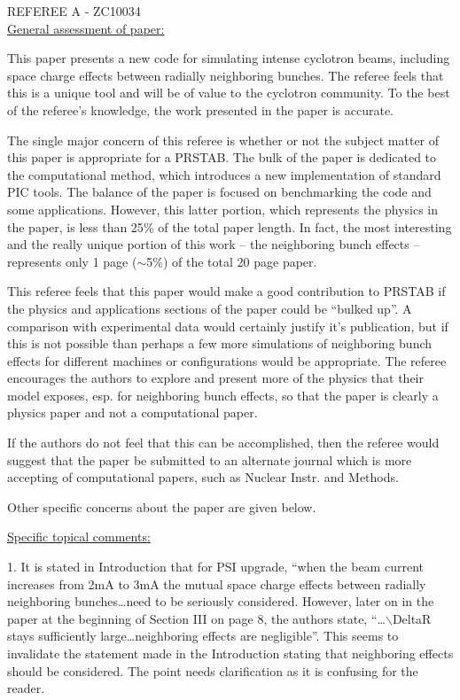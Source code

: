 \documentclass{article}
\begin{document}
 REFEREE A - ZC10034 \\


 \underline {General assessment of paper: }
 
 This paper presents a new code for simulating intense cyclotron beams, 
 including space charge effects between radially neighboring bunches. The 
 referee feels that this is a unique tool and will be of value to the 
 cyclotron community. To the best of the referee's knowledge, the work 
 presented in the paper is accurate. 
 
 The single major concern of this referee is whether or not the subject 
 matter of this paper is appropriate for a PRSTAB. The bulk of the paper is 
 dedicated to the computational method, which introduces a new implementation 
 of standard PIC tools. The balance of the paper is focused on benchmarking 
 the code and some applications. However, this latter portion, which 
 represents the physics in the paper, is less than 25{\%} of the total paper 
 length. In fact, the most interesting and the really unique portion of this 
 work -- the neighboring bunch effects -- represents only 1 page ($\sim 
 $5{\%}) of the total 20 page paper. 
 
 This referee feels that this paper would make a good contribution to PRSTAB 
 if the physics and applications sections of the paper could be ``bulked 
 up''. A comparison with experimental data would certainly justify it's 
 publication, but if this is not possible than perhaps a few more simulations 
 of neighboring bunch effects for different machines or configurations would 
 be appropriate. The referee encourages the authors to explore and present 
 more of the physics that their model exposes, esp. for neighboring bunch 
 effects, so that the paper is clearly a physics paper and not a 
 computational paper. 
 
 If the authors do not feel that this can be accomplished, then the referee 
 would suggest that the paper be submitted to an alternate journal which is 
 more accepting of computational papers, such as Nuclear Instr. and Methods. 
 
 Other specific concerns about the paper are given below. 
 
 \underline {Specific topical comments:}
 
 1. It is stated in Introduction that for PSI upgrade, ``when the beam 
 current increases from 2mA to 3mA the mutual space charge effects between 
 radially neighboring bunches{\ldots}need to be seriously considered. 
 However, later on in the paper at the beginning of Section III on page 8, 
 the authors state, ``{\ldots}$\backslash $DeltaR stays sufficiently 
 large{\ldots}neighboring effects are negligible''. This seems to invalidate 
 the statement made in the Introduction stating that neighboring effects 
 should be considered. The point needs clarification as it is confusing for 
 the reader. 
 
\end{document}
